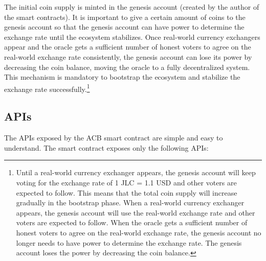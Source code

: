 \documentclass[dvipdfmx,a4paper]{article}
\begin{document}
The initial coin supply is minted in the genesis account (created by the author of the smart contracts). It is important to give a certain amount of coins to the genesis account so that the genesis account can have power to determine the exchange rate until the ecosystem stabilizes. Once real-world currency exchangers appear and the oracle gets a sufficient number of honest voters to agree on the real-world exchange rate consistently, the genesis account can lose its power by decreasing the coin balance, moving the oracle to a fully decentralized system. This mechanism is mandatory to bootstrap the ecosystem and stabilize the exchange rate successfully.\footnote{Until a real-world currency exchanger appears, the genesis account will keep voting for the exchange rate of 1 JLC = 1.1 USD and other voters are expected to follow. This means that the total coin supply will increase gradually in the bootstrap phase. When a real-world currency exchanger appears, the genesis account will use the real-world exchange rate and other voters are expected to follow. When the oracle gets a sufficient number of honest voters to agree on the real-world exchange rate, the genesis account no longer needs to have power to determine the exchange rate. The genesis account loses the power by decreasing the coin balance.}

\subsection{APIs}

The APIs exposed by the ACB smart contract are simple and easy to understand. The smart contract exposes only the following APIs:
\end{document}

